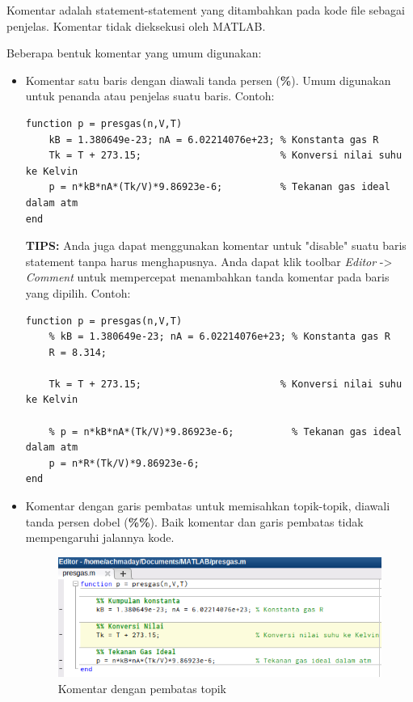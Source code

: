 \documentclass[12pt]{book}
\begin{document}
	Komentar adalah statement-statement yang ditambahkan pada kode file sebagai penjelas.
	Komentar tidak dieksekusi oleh MATLAB.
	
	Beberapa bentuk komentar yang umum digunakan:
	\begin{itemize}
		\item Komentar satu baris dengan diawali tanda persen (\textbf{\%}).
		Umum digunakan untuk penanda atau penjelas suatu baris.
		Contoh:
		\begin{verbatim}
function p = presgas(n,V,T)
	kB = 1.380649e-23; nA = 6.02214076e+23; % Konstanta gas R
	Tk = T + 273.15;                        % Konversi nilai suhu ke Kelvin
	p = n*kB*nA*(Tk/V)*9.86923e-6;          % Tekanan gas ideal dalam atm
end
		\end{verbatim}
	
		\textbf{TIPS:} Anda juga dapat menggunakan komentar untuk "disable" suatu baris statement tanpa harus menghapusnya.
		Anda dapat klik toolbar \textit{Editor} -> \textit{Comment} untuk mempercepat menambahkan tanda komentar pada baris yang dipilih.
		Contoh:
		\begin{verbatim}
function p = presgas(n,V,T)
	% kB = 1.380649e-23; nA = 6.02214076e+23; % Konstanta gas R
	R = 8.314;
	
	Tk = T + 273.15;                        % Konversi nilai suhu ke Kelvin
	
	% p = n*kB*nA*(Tk/V)*9.86923e-6;          % Tekanan gas ideal dalam atm
	p = n*R*(Tk/V)*9.86923e-6;
end
		\end{verbatim}
		\item Komentar dengan garis pembatas untuk memisahkan topik-topik, diawali tanda persen dobel (\textbf{\%\%}).
		Baik komentar dan garis pembatas tidak mempengaruhi jalannya kode.
		
		\begin{figure}[!ht]
			\centering
			\includegraphics[width=350pt]{images/komentopik}
			\caption{Komentar dengan pembatas topik}
		\end{figure}
	\end{itemize}
	
\end{document}
